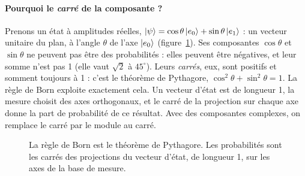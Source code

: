 \paragraph{Pourquoi le \emph{carré} de la composante ?} Prenons un état à amplitudes réelles, $\lvert \psi\rangle=\cos\theta\,\lvert e_0\rangle+\sin\theta\,\lvert e_1\rangle$ : un vecteur unitaire du plan, à l'angle $\theta$ de l'axe $\lvert e_0\rangle$ (figure~\ref{fig:pythagore}). Ses composantes $\cos\theta$ et $\sin\theta$ ne peuvent pas être des probabilités : elles peuvent être négatives, et leur somme n'est pas 1 (elle vaut $\sqrt2$ à $45^\circ$). Leurs \emph{carrés}, eux, sont positifs et somment toujours à 1 : c'est le théorème de Pythagore, $\cos^2\theta+\sin^2\theta=1$. La règle de Born exploite exactement cela. Un vecteur d'état est de longueur 1, la mesure choisit des axes orthogonaux, et le carré de la projection sur chaque axe donne la part de probabilité de ce résultat. Avec des composantes complexes, on remplace le carré par le module au carré.

\begin{figure}[htbp]
\centering
{}
\caption{La règle de Born est le théorème de Pythagore. Les probabilités sont les carrés des projections du vecteur d'état, de longueur 1, sur les axes de la base de mesure.}\label{fig:pythagore}
\end{figure}

